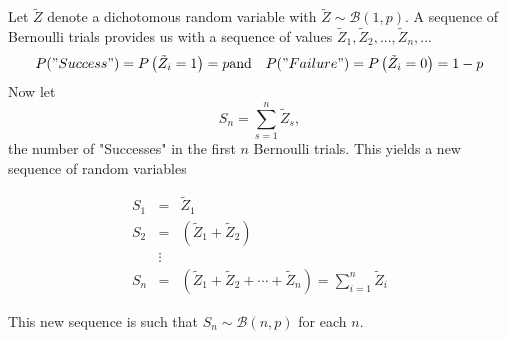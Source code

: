 \documentclass[notes=show,smaller,handout]{beamer}\usepackage[]{graphicx}\usepackage[]{color}
\renewcommand{\Pr}{P}
\begin{document}
\begin{frame}{\secname}
  \begin{example}
  \begin{footnotesize}
    Let $\tilde Z$ denote a dichotomous random variable with $\tilde Z\sim
  \mathcal{B}(1,p)$. A sequence of Bernoulli trials provides us with a sequence of values $\tilde Z_{1},\tilde Z_{2},...,\tilde Z_{n},...$ %
    \begin{eqnarray*}
    \Pr("Success")=\Pr \left( \tilde Z_{i}=1\right) = p & \text{and} & \Pr("Failure")=\Pr \left( \tilde Z_{i}=0\right)  = 1-p
    \end{eqnarray*}
    Now let
    $$S_n=\sum_{s=1}^n \tilde Z_s,$$ the number of "Successes" in the first $n$ Bernoulli trials. This yields a new sequence of random variables
    \begin{small}
    \begin{eqnarray*}
    S_{1} &=& \tilde Z_{1} \\
    S_{2} &=&\left( \tilde Z_{1}+ \tilde Z_{2}\right)\\
    &\vdots&  \\
    S_{n} &=&\left( \tilde Z_{1}+ \tilde Z_{2}+\cdots + \tilde Z_{n}\right) = \sum_{i=1}^n \tilde Z_i
    \end{eqnarray*}
    \end{small}
    This new sequence is such that $S_n\sim \mathcal{B}(n,p)$ for each $n$.
    \end{footnotesize}
  \end{example}
\end{frame}
\end{document}
